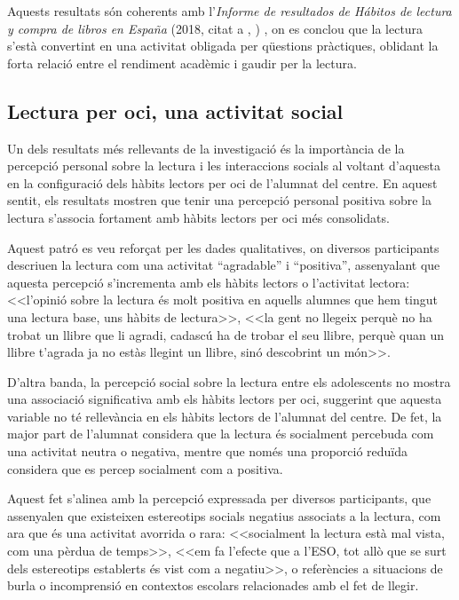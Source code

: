 \documentclass[12pt]{article}
\newcommand{\nestedtextcite}[2]{%
  (#1, citat a \citeauthor{#2}, \citeyear{#2})%
}
\begin{document}
Aquests resultats són coherents amb l'\emph{Informe de resultados de Hábitos de lectura y compra de libros en España} \nestedtextcite{2018}{sanches}, on es conclou que la lectura s'està convertint en una activitat obligada per qüestions pràctiques, oblidant la forta relació entre el rendiment acadèmic i gaudir per la lectura.

\subsection{Lectura per oci, una activitat social}
Un dels resultats més rellevants de la investigació és la importància de la percepció personal sobre la lectura i les interaccions socials al voltant d'aquesta en la configuració dels hàbits lectors per oci de l'alumnat del centre. En aquest sentit, els resultats mostren que tenir una percepció personal positiva sobre la lectura s'associa fortament amb hàbits lectors per oci més consolidats.

Aquest patró es veu reforçat per les dades qualitatives, on diversos participants descriuen la lectura com una activitat “agradable” i “positiva”, assenyalant que aquesta percepció s'incrementa amb els hàbits lectors o l'activitat lectora: <<l'opinió sobre la lectura és molt positiva en aquells alumnes que hem tingut una lectura base, uns hàbits de lectura>>, <<la gent no llegeix perquè no ha trobat un llibre que li agradi, cadascú ha de trobar el seu llibre, perquè quan un llibre t'agrada ja no estàs llegint un llibre, sinó descobrint un món>>.

D'altra banda, la percepció social sobre la lectura entre els adolescents no mostra una associació significativa amb els hàbits lectors per oci, suggerint que aquesta variable no té rellevància en els hàbits lectors de l’alumnat del centre. De fet, la major part de l’alumnat considera que la lectura és socialment percebuda com una activitat neutra o negativa, mentre que només una proporció reduïda considera que es percep socialment com a positiva. 

Aquest fet s'alinea amb la percepció expressada per diversos participants, que assenyalen que existeixen estereotips socials negatius associats a la lectura, com ara que és una activitat avorrida o rara: <<socialment la lectura està mal vista, com una pèrdua de temps>>, <<em fa l'efecte que a l'ESO, tot allò que se surt dels estereotips establerts és vist com a negatiu>>, o referències a situacions de burla o incomprensió en contextos escolars relacionades amb el fet de llegir.
\end{document}
